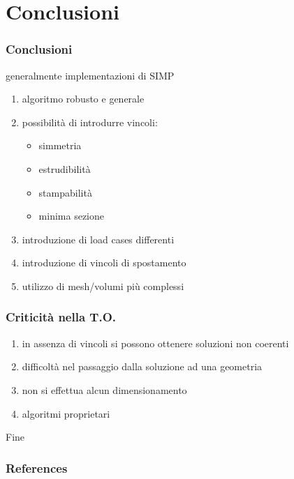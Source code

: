 \documentclass{beamer}
\begin{document}
\section{Conclusioni}

\begin{frame}
	\frametitle{Conclusioni}
	generalmente implementazioni di SIMP
	\begin{enumerate}
		\item algoritmo robusto e generale
		\item possibilit\`{a} di introdurre vincoli:
		\begin{itemize}
			\item simmetria
			\item estrudibilit\`{a}
			\item stampabilit\`{a}
			\item minima sezione
		\end{itemize}
		\item introduzione di load cases differenti
		\item introduzione di vincoli di spostamento
		\item utilizzo di mesh/volumi pi\`{u} complessi
	\end{enumerate}
\end{frame}

\begin{frame}
	\frametitle{Criticit\`{a} nella T.O.}
	\begin{enumerate}
		\item in assenza di vincoli si possono ottenere soluzioni non coerenti
		\item difficolt\`{a} nel passaggio dalla soluzione ad una geometria
		\item non si effettua alcun dimensionamento
		\item algoritmi proprietari
	\end{enumerate}
\end{frame}



\begin{frame}
	\Huge{\centerline{Fine}}
\end{frame}

\begin{frame}[allowframebreaks]
\frametitle{References}
\tiny{
			
			
		}
\end{frame}




\end{document}
